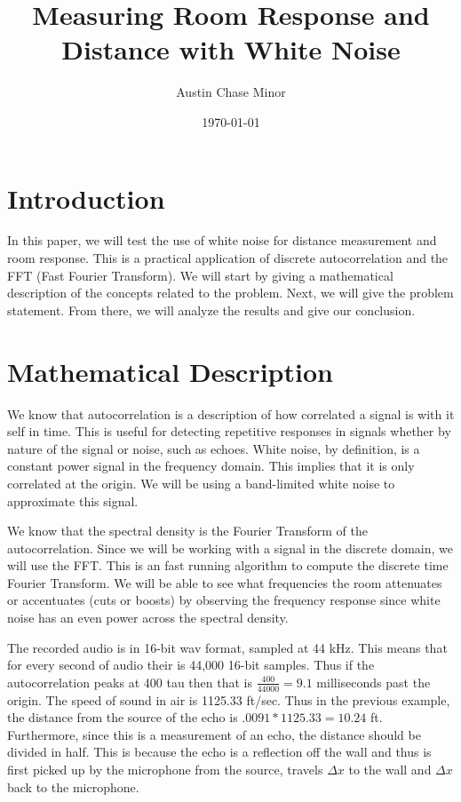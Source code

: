 \documentclass{article}
\author{Austin Chase Minor}
\title{Measuring Room Response and Distance with White Noise}
\date{\today}
\begin{document}
   \maketitle
   \section{Introduction}
      In this paper, we will test the use of
      white noise for distance measurement and
      room response. This is a practical application
      of discrete autocorrelation and the FFT
      (Fast Fourier Transform). We will start by
      giving a mathematical description of the concepts related
      to the problem. Next, we will give the problem statement.
      From there, we will analyze the results and give our
      conclusion.
   \section{Mathematical Description}
      We know that autocorrelation is a description of
      how correlated a signal is with it self in time.
      This is useful for detecting repetitive responses
      in signals whether by nature of the signal or noise,
      such as echoes. White noise, by definition, is a constant
      power signal in the frequency domain. This implies that it
      is only correlated at the origin. We will be using a band-limited
      white noise to approximate this signal.

      We know that the spectral density is the Fourier Transform of
      the autocorrelation. Since we will be working with a signal in the
      discrete domain, we will use the FFT. This is an fast running
      algorithm to compute the discrete time Fourier Transform. We will
      be able to see what frequencies the room attenuates or accentuates (cuts or boosts)
      by observing the frequency response since white noise has an
      even power across the spectral density.

      The recorded audio is in 16-bit wav format, sampled at 44 kHz.
      This means that for every second of audio their is 44,000 16-bit
      samples. Thus if the autocorrelation peaks at 400 tau then
      that is $\frac{400}{44000} = 9.1$ milliseconds past the origin.
      The speed of sound in air is 1125.33 ft/sec. Thus in the previous
      example, the distance from the source
      of the echo is $.0091*1125.33 = 10.24$ ft. Furthermore, since this
      is a measurement of an echo, the distance should be divided in half.
      This is because the echo is a reflection off the wall and thus is first
      picked up by the microphone from the source, travels $\Delta x$ to the
      wall and $\Delta x$ back to the microphone.
\end{document}
